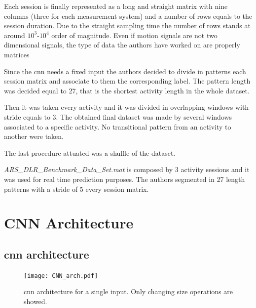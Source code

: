 
Each session is finally represented as a long and straight matrix with nine columns (three for each measurement system) and a number of rows equals to the session duration. Due to the straight sampling time the number of rows stands at around $10^3$-$10^4$ order of magnitude.
Even if motion signals are not two dimensional signals, the type of data the authors have worked on are properly matrices


Since the \gls{cnn} needs a fixed input the authors decided to divide in patterns each session matrix and associate to them the corresponding label. The pattern length was decided equal to 27, that is the shortest activity length in the whole dataset. 

Then it was taken every activity and it was divided in overlapping windows with stride equals to 3. The obtained final dataset was made by several windows associated to a specific activity. No transitional pattern from an activity to another were taken.


The last procedure attuated was a shuffle of the dataset.


\textit{ARS\_DLR\_Benchmark\_Data\_Set.mat} is composed by 3 activity sessions and it was used for real time prediction purposes. The authors segmented in 27 length patterns with a stride of 5 every session matrix.  




\section{CNN Architecture}
\label{sec:cnn_architecture}

\subsection{\gls{cnn} architecture}

\begin{figure}[htp]
\texttt{[image: CNN\_arch.pdf]}
\caption{\gls{cnn} architecture for a single input. Only changing size operations are showed.}
\label{fig:CNN}
\end{figure}


